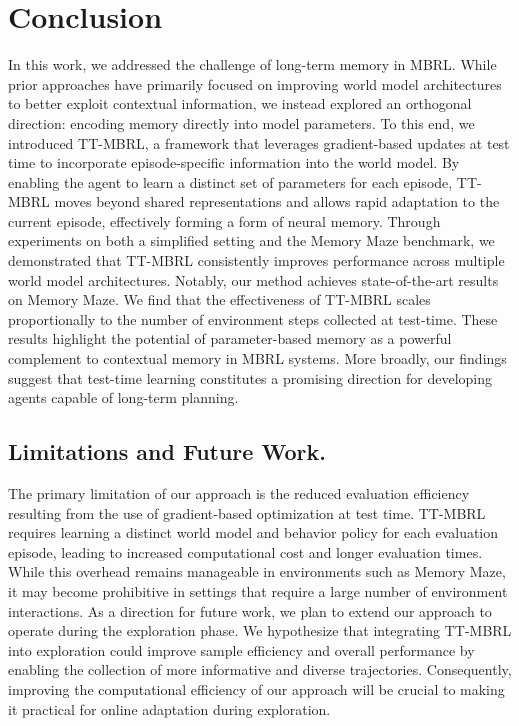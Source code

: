 \section{Conclusion}

In this work, we addressed the challenge of long-term memory in MBRL. While prior approaches have primarily focused on improving world model architectures to better exploit contextual information, we instead explored an orthogonal direction: encoding memory directly into model parameters. To this end, we introduced TT-MBRL, a framework that leverages gradient-based updates at test time to incorporate episode-specific information into the world model. By enabling the agent to learn a distinct set of parameters for each episode, TT-MBRL moves beyond shared representations and allows rapid adaptation to the current episode, effectively forming a form of neural memory. Through experiments on both a simplified setting and the Memory Maze benchmark, we demonstrated that TT-MBRL consistently improves performance across multiple world model architectures. Notably, our method achieves state-of-the-art results on Memory Maze. We find that the effectiveness of TT-MBRL scales proportionally to the number of environment steps collected at test-time. These results highlight the potential of parameter-based memory as a powerful complement to contextual memory in MBRL systems. More broadly, our findings suggest that test-time learning constitutes a promising direction for developing agents capable of long-term planning.

\subsection{Limitations and Future Work.}

The primary limitation of our approach is the reduced evaluation efficiency resulting from the use of gradient-based optimization at test time. TT-MBRL requires learning a distinct world model and behavior policy for each evaluation episode, leading to increased computational cost and longer evaluation times. While this overhead remains manageable in environments such as Memory Maze, it may become prohibitive in settings that require a large number of environment interactions. As a direction for future work, we plan to extend our approach to operate during the exploration phase. We hypothesize that integrating TT-MBRL into exploration could improve sample efficiency and overall performance by enabling the collection of more informative and diverse trajectories. Consequently, improving the computational efficiency of our approach will be crucial to making it practical for online adaptation during exploration.